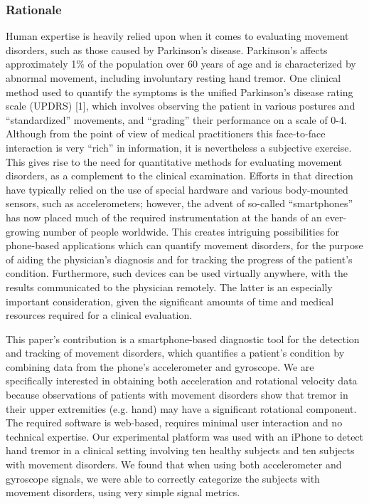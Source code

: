 \subsubsection{Rationale}
\label{subsubsec:smartCT1Rationale}
Human expertise is heavily relied upon when it comes to evaluating movement disorders, such as those caused by Parkinson’s disease. Parkinson’s affects approximately 1\% of the population over 60 years of age and is characterized by abnormal movement, including involuntary resting hand tremor. One clinical method used to quantify the symptoms is the unified Parkinson’s disease rating scale (\gls{UPDRS}) [1], which involves observing the patient in various postures and ``standardized'' movements, and ``grading'' their performance on a scale of 0-4. Although from the point of view of medical practitioners this face-to-face interaction is very “rich” in information, it is nevertheless a subjective exercise. This gives rise to the need for quantitative methods for evaluating movement disorders, as a complement to the clinical examination. Efforts in that direction have typically relied on the use of special hardware and various body-mounted sensors, such as accelerometers; however, the advent of so-called “smartphones” has now placed much of the required instrumentation at the hands of an ever-growing number of people worldwide. This creates intriguing possibilities for phone-based applications which can quantify movement disorders, for the purpose of aiding the physician’s diagnosis and for tracking the progress of the patient’s condition. Furthermore, such devices can be used virtually anywhere, with the results communicated to the physician remotely. The latter is an especially important consideration, given the significant amounts of time and medical resources required for a clinical evaluation. 

This paper’s contribution is a smartphone-based diagnostic tool for the detection and tracking of movement disorders, which quantifies a patient’s condition by combining data from the phone’s accelerometer and gyroscope. We are specifically interested in obtaining both acceleration and rotational velocity data because observations of patients with movement disorders show that tremor in their upper extremities (e.g. hand) may have a significant rotational component. The required software is web-based, requires minimal user interaction and no technical expertise. Our experimental platform was used with an iPhone to detect hand tremor in a clinical setting involving ten healthy subjects and ten subjects with movement disorders. We found that when using both accelerometer and gyroscope signals, we were able to correctly categorize the subjects with movement disorders, using very simple signal metrics. 


